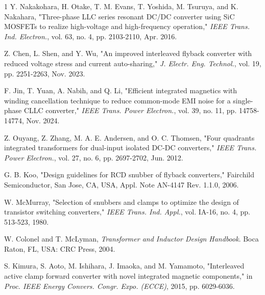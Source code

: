 \documentclass[lettersize,journal]{IEEEtran}
\begin{document}
\begin{thebibliography}{1}
Y. Nakakohara, H. Otake, T. M. Evans, T. Yoshida, M. Tsuruya, and K. Nakahara, "Three-phase LLC series resonant DC/DC converter using SiC MOSFETs to realize high-voltage and high-frequency operation," \textit{IEEE Trans. Ind. Electron.}, vol. 63, no. 4, pp. 2103-2110, Apr. 2016.

Z. Chen, L. Shen, and Y. Wu, "An improved interleaved flyback converter with reduced voltage stress and current auto-sharing," \textit{J. Electr. Eng. Technol.}, vol. 19, pp. 2251-2263, Nov. 2023.

F. Jin, T. Yuan, A. Nabih, and Q. Li, "Efficient integrated magnetics with winding cancellation technique to reduce common-mode EMI noise for a single-phase CLLC converter," \textit{IEEE Trans. Power Electron.}, vol. 39, no. 11, pp. 14758-14774, Nov. 2024.

Z. Ouyang, Z. Zhang, M. A. E. Andersen, and O. C. Thomsen, "Four quadrants integrated transformers for dual-input isolated DC-DC converters," \textit{IEEE Trans. Power Electron.}, vol. 27, no. 6, pp. 2697-2702, Jun. 2012.

G. B. Koo, "Design guidelines for RCD snubber of flyback converters," Fairchild Semiconductor, San Jose, CA, USA, Appl. Note AN-4147 Rev. 1.1.0, 2006.

W. McMurray, "Selection of snubbers and clamps to optimize the design of transistor switching converters," \textit{IEEE Trans. Ind. Appl.}, vol. IA-16, no. 4, pp. 513-523, 1980.

W. Colonel and T. McLyman, \textit{Transformer and Inductor Design Handbook}. Boca Raton, FL, USA: CRC Press, 2004.

S. Kimura, S. Aoto, M. Ishihara, J. Imaoka, and M. Yamamoto, "Interleaved active clamp forward converter with novel integrated magnetic components," in \textit{Proc. IEEE Energy Convers. Congr. Expo. (ECCE)}, 2015, pp. 6029-6036.

\end{thebibliography}

%
%
\vfill
\end{document}
